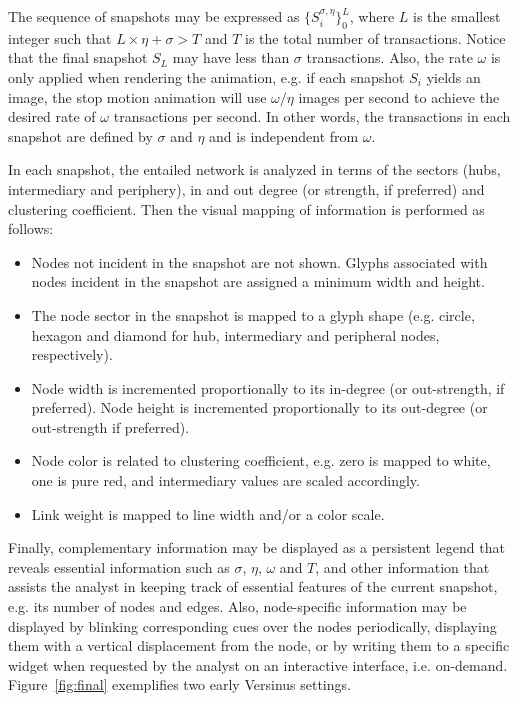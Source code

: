 \documentclass[runningheads]{llncs}
\begin{document}
\noindent The sequence of snapshots may be expressed as $\{S_i^{\sigma, \eta}\}_0^{L}$, where $L$ is the smallest integer such that $L\times \eta + \sigma > T$ and $T$ is the total number of transactions. Notice that the final snapshot $S_L$ may have less than $\sigma$ transactions. Also, the rate $\omega$ is only applied when rendering the animation, e.g. if each snapshot $S_i$ yields an image, the stop motion animation will use $\omega/\eta$ images per second to achieve the desired rate of $\omega$ transactions per second. In other words, the transactions in each snapshot are defined by $\sigma$ and $\eta$ and is independent from $\omega$.

In each snapshot, the entailed network is analyzed in terms of the sectors (hubs, intermediary and periphery), in and out degree (or strength, if preferred) and clustering coefficient. Then the visual mapping of information is performed as follows:
\begin{itemize}
  \item Nodes not incident in the snapshot are not shown. Glyphs associated with nodes incident in the snapshot are assigned a minimum width and height.
  \item The node sector in the snapshot is mapped to a glyph shape (e.g. circle, hexagon and diamond for hub, intermediary and peripheral nodes, respectively).
  \item Node width is incremented proportionally to its in-degree (or out-strength, if preferred). Node height is incremented proportionally to its out-degree (or out-strength if preferred).
  \item Node color is related to clustering coefficient, e.g. zero is mapped to white, one is pure red, and intermediary values are scaled accordingly.
  \item Link weight is mapped to line width and/or a color scale.
\end{itemize}

\noindent Finally, complementary information may be displayed as a persistent legend that reveals essential information such as $\sigma$, $\eta$, $\omega$ and $T$, and other information that assists the analyst in keeping track of essential features of the current snapshot, e.g. its number of nodes and edges.
Also, node-specific information may be displayed by blinking corresponding cues over the nodes periodically, displaying them with a vertical displacement from the node, or by writing them to a specific widget when requested by the analyst on an interactive interface, i.e. on-demand.
Figure~\ref{fig:final} exemplifies two early Versinus settings.
\end{document}

